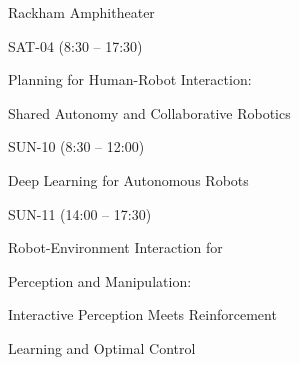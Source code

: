 \documentclass{article}
\begin{document}
\rssheader[2in]

\rssbig
\begin{center}
Rackham Amphitheater
\end{center}

\vfill

\rssmed
\begin{center}
SAT-04 (8:30 -- 17:30)
\end{center}

\rsssm
\begin{center}
Planning for Human-Robot Interaction: \par \noindent Shared Autonomy and
Collaborative Robotics
\end{center}

\vfill

\rssmed
\begin{center}
SUN-10 (8:30 -- 12:00)
\end{center}

\rsssm
\begin{center}
Deep Learning for Autonomous Robots
\end{center}

\vfill

\rssmed
\begin{center}
SUN-11 (14:00 -- 17:30)
\end{center}

\rsssm
\begin{center}
Robot-Environment Interaction for \par \noindent Perception and Manipulation:
\par \noindent Interactive Perception Meets Reinforcement \par Learning
\noindent and Optimal Control
\end{center}

\vfill
\end{document}
